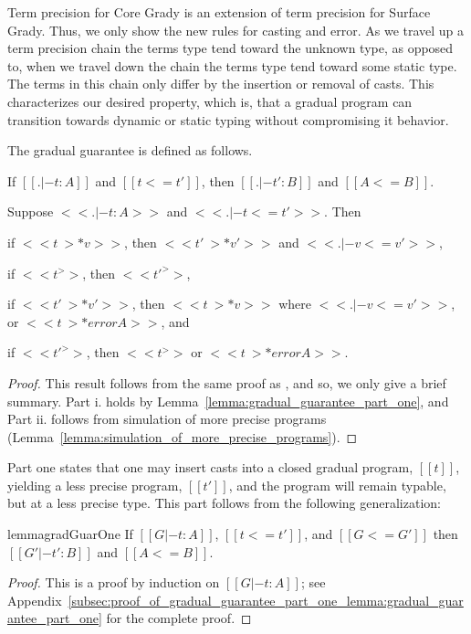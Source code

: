 Term precision for Core Grady is an extension of term precision for
Surface Grady.  Thus, we only show the new rules for casting and
error.  As we travel up a term precision chain the terms type tend
toward the unknown type, as opposed to, when we travel down the chain
the terms type tend toward some static type.  The terms in this chain
only differ by the insertion or removal of casts.  This characterizes
our desired property, which is, that a gradual program can transition
towards dynamic or static typing without compromising it behavior.

The gradual guarantee is defined as follows.
\begin{theorem}
  \label{thm:gradual_guarantee} 
  \begin{enumR}
  \item If $[[. |- t : A]]$ and $[[t <= t']]$, then $[[. |- t' : B]]$ and $[[A <= B]]$.
  \item Suppose $<<. |- t : A>>$ and $<<. |- t <= t'>>$. Then
    \begin{enumA}
    \item if $<<t ~>* v>>$, then $<<t' ~>* v'>>$ and $<<. |- v <= v'>>$,
    \item if $<<t ^>>$, then $<<t' ^>>$,
    \item if $<<t' ~>* v'>>$, then $<<t ~>* v>>$ where $<<. |- v <= v'>>$, or $<<t ~>* error A>>$, and
    \item if $<<t' ^>>$, then $<<t ^>>$ or $<<t ~>* error A>>$.
    \end{enumA}
  \end{enumR}
\end{theorem}
\begin{proof}
  This result follows from the same proof as \cite{Siek:2015}, and so,
  we only give a brief summary.  Part i. holds by
  Lemma~\ref{lemma:gradual_guarantee_part_one}, and Part ii. follows
  from simulation of more precise programs
  (Lemma~\ref{lemma:simulation_of_more_precise_programs}).
\end{proof}
Part one states that one may insert casts into a closed gradual
program, $[[t]]$, yielding a less precise program, $[[t']]$, and the
program will remain typable, but at a less precise type.  This part
follows from the following generalization:
\begin{restatable}{lemma}{gradGuarOne}
  \label{lemma:gradual_guarantee_part_one}
  If $[[G |- t : A]]$, $[[t <= t']]$, and $[[G <= G']]$ then $[[G' |- t' : B]]$ and $[[A <= B]]$.
\end{restatable}
\begin{proof}
  This is a proof by induction on $[[G |- t : A]]$; see
  Appendix~\ref{subsec:proof_of_gradual_guarantee_part_one_lemma:gradual_guarantee_part_one}
  for the complete proof.
\end{proof}

